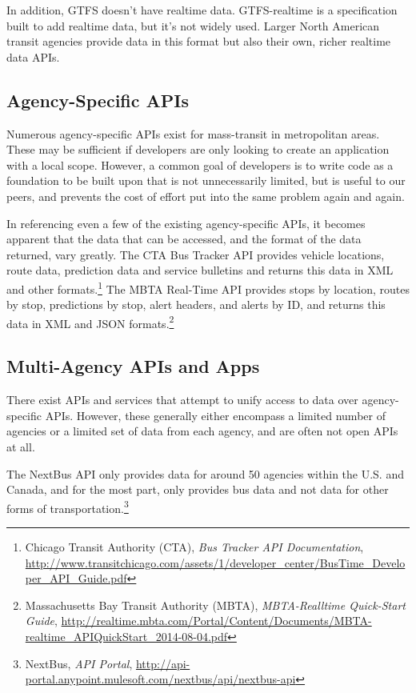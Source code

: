 \documentclass[12pt]{article}
\begin{document}
In addition, GTFS doesn't have realtime data. GTFS-realtime is a specification built to add
realtime data, but it's not widely used. Larger North American transit agencies provide
data in this format but also their own, richer realtime data APIs.

\subsection{Agency-Specific APIs}

Numerous agency-specific APIs exist for mass-transit in metropolitan areas.
These may be sufficient if developers are only looking to create an application with a local scope. However,
a common goal of developers is to write code as a foundation to be built upon that is not unnecessarily limited,
but is useful to our peers, and prevents the cost of effort put into the same
problem again and again.

In referencing even a few of the existing agency-specific APIs, it
becomes apparent that the data that can be accessed, and the format of the data returned, 
vary greatly. The CTA Bus Tracker API provides vehicle locations, route data, prediction data and 
service bulletins and returns this data in XML and other formats.\footnote{Chicago Transit Authority (CTA), \textit{Bus Tracker API Documentation},
\url{http://www.transitchicago.com/assets/1/developer\_center/BusTime\_Developer\_API\_Guide.pdf}} The MBTA Real-Time API provides
stops by location, routes by stop, predictions by stop, alert headers, and alerts by ID, and returns
this data in XML and JSON formats.\footnote{Massachusetts Bay Transit Authority (MBTA), \textit{MBTA-Realltime Quick-Start Guide},
\url{http://realtime.mbta.com/Portal/Content/Documents/MBTA-realtime\_APIQuickStart\_2014-08-04.pdf}}

\subsection{Multi-Agency APIs and Apps}
There exist APIs and services that attempt to unify access to data over agency-specific APIs.
However, these generally either encompass a limited number of agencies or a limited set of
data from each agency, and are often not open APIs at all.

The NextBus API only provides data for
around 50 agencies within the U.S. and Canada, and for the most part, only provides bus data 
and not data for other forms of transportation.\footnote{NextBus, \textit{API Portal},
	\url{http://api-portal.anypoint.mulesoft.com/nextbus/api/nextbus-api}}
\end{document}
